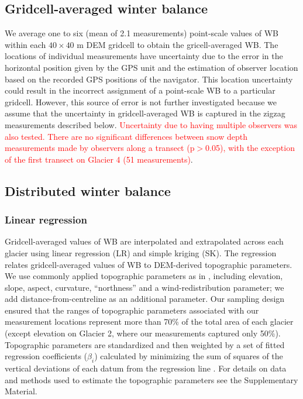\documentclass[twocolumn, letterpaper]{igs}
\begin{document}
\subsection{Gridcell-averaged winter balance}

We average one to six (mean of 2.1 measurements) point-scale values of WB within each $40 \times 40$ m DEM gridcell to obtain the gricell-averaged WB. The locations of individual measurements have  uncertainty due to the error in the horizontal position given by the GPS unit and the estimation of observer location based on the recorded GPS positions of the navigator. This location uncertainty could result in the incorrect assignment of a point-scale WB to a particular gridcell. However, this source of error is not further investigated because we assume that the uncertainty in gridcell-averaged WB is captured in the zigzag measurements described below. \textcolor{red}{Uncertainty due to having multiple observers was also tested. There are no significant differences between snow depth measurements made by observers along a transect (p$>$0.05), with the exception of the first transect on Glacier 4 (51 measurements)}. 

\subsection{Distributed winter balance}

\subsubsection{Linear regression}

Gridcell-averaged values of WB are interpolated and extrapolated across each glacier using linear regression (LR) and simple kriging (SK). The regression relates gridcell-averaged values of WB to DEM-derived topographic parameters. We use commonly applied topographic parameters as in \cite{McGrath2015}, including elevation, slope, aspect, curvature, ``northness'' and a wind-redistribution parameter; we add distance-from-centreline as an additional parameter. Our sampling design ensured that the ranges of topographic parameters associated with our measurement locations represent more than 70\% of the total area of each glacier (except elevation on Glacier 2, where our measurements captured only 50\%). Topographic parameters are standardized and then weighted by a set of fitted regression coefficients ($\beta_i$) calculated by minimizing the sum of squares of the vertical deviations of each datum from the regression line \citep{Davis1986}. For details on data and methods used to estimate the topographic parameters see the Supplementary Material. 
\end{document}
